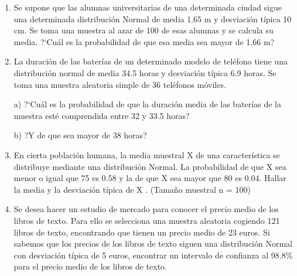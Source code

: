 \begin{adjustwidth}{20pt}{10pt}
\begin{enumerate}[PB. 1. ]
	\item 	Se supone que las alumnas universitarias de una determinada ciudad sigue una determinada distribución Normal de media 1.65 m y desviación típica 10 cm. Se toma una muestra al azar de 100 de esas alumnas y se calcula su media. ?`Cuál es la probabilidad de que esa media sea mayor de 1.66 m?
		
		\hspace{-1cm}\vspace{1cm}
		
	\item 	La duración de las baterías de un determinado modelo de teléfono tiene una distribución normal de media 34.5 horas y desviación típica 6.9 horas. Se toma una muestra aleatoria simple de 36 teléfonos móviles.
	
a) ?`Cuál es la probabilidad de que la duración media de las baterías de la muestra esté comprendida entre 32 y 33.5 horas?

b) ?Y de que sea mayor de 38 horas? 
		
		\hspace{-1cm}\vspace{1cm}
		
	\item 	En cierta población humana, la media muestral X de una característica se distribuye mediante una distribución Normal. La probabilidad de que X sea menor o igual que 75 es 0.58 y la de que X sea mayor que 80 es 0.04. Hallar la media y la desviación típica de X . (Tamaño muestral n = 100) 
		
		\hspace{-1cm}\vspace{1cm}
		
		
	\item 	Se desea hacer un estudio de mercado para conocer el precio medio de los libros de texto. Para ello se selecciona una muestra aleatoria cogiendo 121 libros de texto, encontrando que tienen un precio medio de 23 euros. Si sabemos que los precios de los libros de texto siguen una distribución Normal con desviación típica de 5 euros, encontrar un intervalo de confianza al 98.8\% para el precio medio de los libros de texto.
		
		\hspace{-1cm}\vspace{1cm}
		

\end{enumerate}
\end{adjustwidth}
